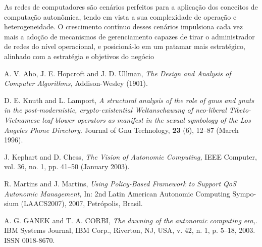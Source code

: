 \documentclass[11pt,twoside]{article}
\begin{document}
As redes de computadores são cenários perfeitos para a aplicação dos conceitos de computação autonômica, tendo em vista a sua complexidade de operação e heterogeneidade. O crescimento contínuo desses cenários impulsiona cada vez mais a adoção de mecanismos de gerenciamento capazes de tirar o administrador de redes do nível operacional, e posicioná-lo em um patamar mais estratégico, alinhado com a estratégia e objetivos do negócio

\begin{thebibliography}{99}

 A. V. Aho, J. E. Hopcroft and J.  D.  Ullman, {\it The
Design and Analysis of Computer Algorithms,} Addison-Wesley (1901).

 D. E. Knuth and L. Lamport, {\it A structural analysis
of the role of gnus and gnats in the post-modernistic, crypto-existential 
Weltanschauung of neo-liberal Tibeto-Vietnamese leaf blower operators 
as manifest in the sexual symbology of the Los Angeles Phone Directory}.
Journal of Gnu Technology, {\bf 23} (6), 12--87
(March 1996).

 J. Kephart and D. Chess, {\it The Vision of Autonomic 
Computing,} IEEE Computer, vol. 36, no. 1, pp. 41--50
(January 2003).

 R. Martins and J. Martins, {\it Using Policy-Based Framework to Support QoS 
Autonomic Management,} In: 2nd Latin American Autonomic Computing Sympo- sium (LAACS2007), 
2007, Petrópolis, Brasil.

 A. G. GANEK and  T. A. CORBI, {\it The dawning of the autonomic computing era,}. IBM Systems Journal, IBM Corp., Riverton, NJ, USA, v. 42, n. 1, p. 5–18, 2003. ISSN 0018-8670.

\end{thebibliography}
\end{document}
